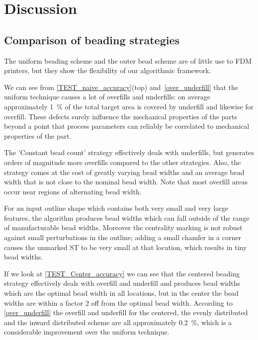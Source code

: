 \section{Discussion}


\subsection{Comparison of beading strategies}
The uniform beading scheme and the outer bead scheme are of little use to FDM printers, but they show the flexibility of our algorithmic framework.

We can see from \cref{TEST_naive_accuracy}(top) and~\ref{over_underfill} that the uniform technique causes a lot of overfills and underfills: on average approximately \SI{1}{\percent} of the total target area is covered by underfill and likewise for overfill.
These defects surely influence the mechanical properties of the parts beyond a point that process parameters can reliably be correlated to mechanical properties of the part.


The 'Constant bead count' strategy effectively deals with underfills, but generates orders of magnitude more overfills compared to the other strategies. 
Also, the strategy comes at the cost of greatly varying bead widths and an average bead width that is not close to the nominal bead width.
Note that most overfill areas occur near regions of alternating bead width. 

For an input outline shape which contains both very small and very large features, the algorithm produces bead widths which can fall outside of the range of manufacturable bead widths.
Moreover the centrality marking is not robust against small perturbations in the outline; adding a small chamfer in a corner causes the unmarked ST to be very small at that location, which results in tiny bead widths.

If we look at \cref{TEST_Center_accuracy} we can see that
the centered beading strategy effectively deals with overfill and underfill and produces bead widths which are the optimal bead width in all locations, but in the center the bead widths are within a factor 2 off from the optimal bead width.
According to \cref{over_underfill} the overfill and underfill for the centered, the evenly distributed and the inward distributed scheme are all approximately \SI{0.2}{\percent}, which is a considerable improvement over the uniform technique.

